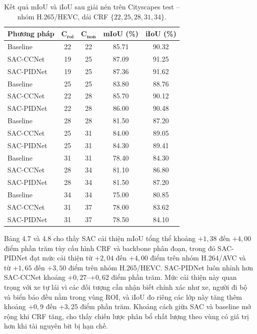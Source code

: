\begin{table}[H]
\centering
\caption{Kết quả mIoU và iIoU sau giải nén trên Cityscapes test -- nhóm H.265/HEVC,
         dải CRF $\{22,25,28,31,34\}$.}
\label{tab:miou-iiou-x265}
\small
\begin{tabular}{p{}cccc}
\toprule
\textbf{Phương pháp} & $\boldsymbol{C_{roi}}$ & $\boldsymbol{C_{non}}$
    & \textbf{mIoU (\%)} & \textbf{iIoU (\%)} \\
\midrule
Baseline  & 22 & 22 & 85.71 & 90.32 \\
SAC-CCNet & 19 & 25 & 87.09 & 91.25 \\
SAC-PIDNet & 19 & 25 & 87.36 & 91.62 \\
\midrule
Baseline  & 25 & 25 & 83.80 & 88.76 \\
SAC-CCNet & 22 & 28 & 85.70 & 90.12 \\
SAC-PIDNet & 22 & 28 & 86.00 & 90.48 \\
\midrule
Baseline  & 28 & 28 & 81.50 & 87.20 \\
SAC-CCNet & 25 & 31 & 84.00 & 89.05 \\
SAC-PIDNet & 25 & 31 & 84.30 & 89.41 \\
\midrule
Baseline  & 31 & 31 & 78.40 & 84.30 \\
SAC-CCNet & 28 & 34 & 81.10 & 86.80 \\
SAC-PIDNet & 28 & 34 & 81.50 & 87.20 \\
\midrule
Baseline  & 34 & 34 & 75.00 & 80.85 \\
SAC-CCNet & 31 & 37 & 78.00 & 83.62 \\
SAC-PIDNet & 31 & 37 & 78.50 & 84.10 \\
\bottomrule
\end{tabular}
\end{table}

Bảng 4.7 và 4.8
 cho thấy SAC cải thiện mIoU tổng thể khoảng $+1{,}38$ đến $+4{,}00$ điểm phần trăm tùy cấu hình CRF và backbone phân đoạn, trong đó SAC-PIDNet đạt mức cải thiện từ $+2{,}04$ đến $+4{,}00$ điểm trên nhóm H.264/AVC và từ $+1{,}65$ đến $+3{,}50$ điểm trên nhóm H.265/HEVC. SAC-PIDNet luôn nhỉnh hơn SAC-CCNet khoảng $+0{,}27$--$+0{,}62$ điểm phần trăm. Mức cải thiện này quan trọng với xe tự lái vì các đối tượng cần nhận biết chính xác như xe, người đi bộ và biển báo đều nằm trong vùng ROI, và iIoU đo riêng các lớp này tăng thêm khoảng $+0{,}9$ đến $+3{,}25$ điểm phần trăm. Khoảng cách giữa SAC và baseline mở rộng khi CRF tăng, cho thấy chiến lược phân bổ chất lượng theo vùng có giá trị hơn khi tài nguyên bit bị hạn chế.

